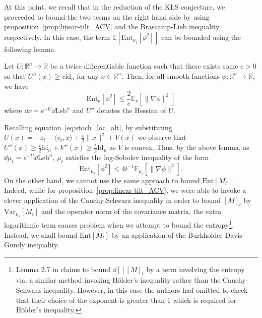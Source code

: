 At this point, we recall that in the reduction of the KLS conjecture, we proceeded to bound the two terms on the 
right hand side by using proposition~\ref{prop:linear-tilt_ACV} and the Brascamp-Lieb inequality respectively. 
In this case, the term \(\mathbb{E}[\text{Ent}_{\mu_t}[\phi^2]]\) can be bounded using the following lemma.

\begin{lemma}\label{lem:entropy_BL}
  Let \(U : \mathbb{R}^n \to \mathbb{R}\) be a twice differentiable function such that
  there exists some \(c > 0\) so that \(U''(x) \ge c\text{id}_n\) for any \(x \in \mathbb{R}^n\). 
  Then, for all smooth functions
  \(\phi : \mathbb{R}^n \to \mathbb{R}\), we have 
  \[\text{Ent}_\nu[\phi^2] \le \frac{2}{c}\mathbb{E}_\nu[\|\nabla\phi\|^2]\]
  where \(\dd \nu = e^{-U} \dd \text{Leb}^n\) and \(U''\) denotes the Hessian of \(U\).
\end{lemma}

Recalling equation~\eqref{eq:stoch_loc_alt}, by substituting \(U(x) = - z_t - \langle v_t, x\rangle + \frac{t}{2}\|x\|^2 + V(x)\)
we observe that \(U''(x) \ge \frac{t}{2}\text{Id}_n + V''(x) \ge \frac{t}{2}\text{Id}_n\) as \(V\) is convex.
Thus, by the above lemma, as \(\dd \mu_t = e^{-U} \dd \text{Leb}^n\), \(\mu_t\) satisfies the log-Sobolev 
inequality of the form
\begin{equation}
  \text{Ent}_{\mu_t}[\phi^2] \le 4t^{-1} \mathbb{E}_{\mu_t}[\|\nabla \phi\|^2].
\end{equation} 
On the other hand, we cannot use the same approach to bound \(\text{Ent}[M_t]\). Indeed, while for 
proposition~\ref{prop:linear-tilt_ACV}, we were able to invoke a clever application of the Cauchy-Schwarz inequality 
in order to bound \([M]_t\) by \(\text{Var}_{\mu_t}[M_t]\) and the operator norm of the covariance matrix, the extra logarithmic term causes problem 
when we attempt to bound the entropy\footnote{Lemma 2.7 in \cite{Lee_2017} claims to bound \(\dd[] [M]_t\) by 
a term involving the entropy via. a similar method invoking Hölder's inequality rather than the Cauchy-Schwarz inequality. However,
in this case the authors had omitted to check that their choice of the exponent is greater than 1 which is required for Hölder's inequality.}. 
Instead, we shall bound \(\text{Ent}[M_t]\) by an application of the Burkholder-Davis-Gundy inequality. 

